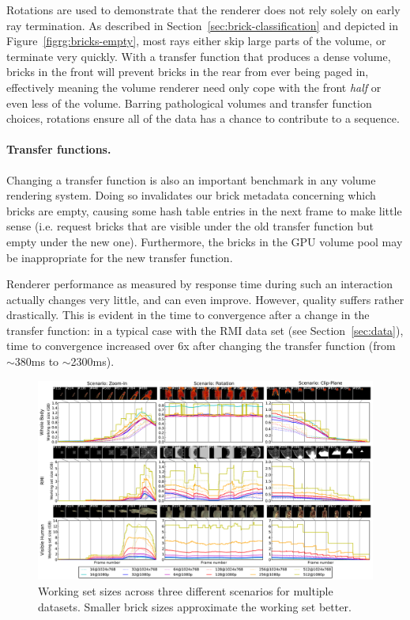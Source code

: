 Rotations are used to demonstrate that the renderer does not rely
solely on early ray termination.  As described in
Section~\ref{sec:brick-classification} and depicted in
Figure~\ref{figrg:bricks-empty}, most rays either skip large parts of
the volume, or terminate very quickly.  With a transfer function that
produces a dense volume, bricks in the front will prevent bricks in the
rear from ever being paged in, effectively meaning the volume renderer
need only cope with the front \emph{half} or even less of the volume.
Barring pathological volumes and transfer function choices, rotations
ensure all of the data has a chance to contribute to a sequence.

\paragraph{Transfer functions.} Changing a transfer function is also
an important benchmark in any volume rendering system.  Doing so
invalidates our brick metadata concerning which bricks are empty,
causing some hash table entries in the next frame to make little sense
(i.e. request bricks that are visible under the old transfer function
but empty under the new one).  Furthermore, the bricks in the GPU
volume pool may be inappropriate for the new transfer function.

Renderer performance as measured by response time during such an
interaction actually changes very little, and can even improve.
However, quality suffers rather drastically.  This is evident in the
time to convergence after a change in the transfer function: in a
typical case with the RMI data set (see Section~\ref{sec:data}), time
to convergence increased over 6x after changing the transfer function
(from $\sim$380ms to $\sim$2300ms).

\begin{figure}
  \centering
  \includegraphics[width=0.98\linewidth]{images/rg/workingSets1-150dpi.pdf}
  \caption{Working set sizes across three different scenarios for
  multiple datasets.  Smaller brick sizes approximate the working set
  better.}
  \label{figrg:working-set}
\end{figure}

